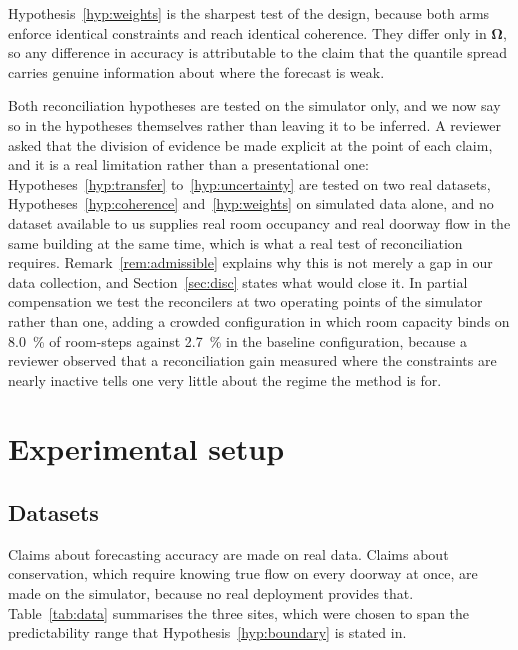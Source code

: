 \documentclass[11pt]{article}
\theoremstyle{plain}
\theoremstyle{definition}
\theoremstyle{remark}
\newcommand{\bOm}{\bm{\Omega}}
\newif\ifrevisionmarkup
\newcommand{\new}[1]{\ifrevisionmarkup\textcolor{revision}{#1}\else#1\fi}
\begin{document}
Hypothesis~\ref{hyp:weights} is the sharpest test of the design, because both arms enforce identical constraints and reach identical coherence. They differ only in $\bOm$, so any difference in accuracy is attributable to the claim that the quantile spread carries genuine information about where the forecast is weak.

\new{Both reconciliation hypotheses are tested on the simulator only, and we now say so in the hypotheses themselves rather than leaving it to be inferred. A reviewer asked that the division of evidence be made explicit at the point of each claim, and it is a real limitation rather than a presentational one: Hypotheses~\ref{hyp:transfer} to~\ref{hyp:uncertainty} are tested on two real datasets, Hypotheses~\ref{hyp:coherence} and~\ref{hyp:weights} on simulated data alone, and no dataset available to us supplies real room occupancy and real doorway flow in the same building at the same time, which is what a real test of reconciliation requires. Remark~\ref{rem:admissible} explains why this is not merely a gap in our data collection, and Section~\ref{sec:disc} states what would close it. In partial compensation we test the reconcilers at two operating points of the simulator rather than one, adding a crowded configuration in which room capacity binds on \SI{8.0}{\percent} of room-steps against \SI{2.7}{\percent} in the baseline configuration, because a reviewer observed that a reconciliation gain measured where the constraints are nearly inactive tells one very little about the regime the method is for.}

\section{Experimental setup}
\label{sec:setup}

\subsection{Datasets}

Claims about forecasting accuracy are made on real data. Claims about conservation, which require knowing true flow on every doorway at once, are made on the simulator, because no real deployment provides that. Table~\ref{tab:data} summarises the three sites, which were chosen to span the predictability range that Hypothesis~\ref{hyp:boundary} is stated in.
\end{document}
